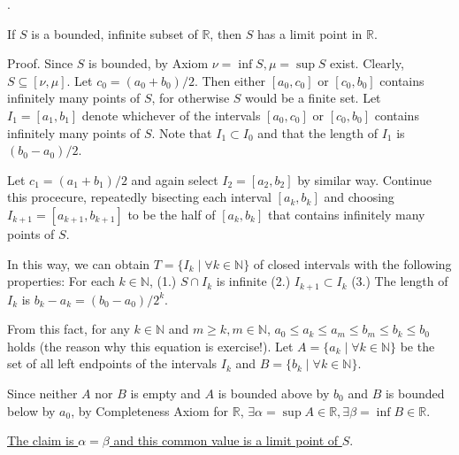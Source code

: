 \documentclass[8pt]{beamer}
\newcommand{\mbb}[1]{\mathbb{#1}}
\begin{document}
\begin{frame}{.}
    \begin{theorem}\label{th:4}
        If $S$ is a bounded, infinite subset of $\mbb{R}$, then $S$ has a limit point in $\mbb{R}$.

        \smallskip
        \text{}
        Proof.
        Since $S$ is bounded, by Axiom $\nu = \inf S, \mu = \sup S$ exist.
        Clearly, $S \subseteq [\nu, \mu]$.
        Let $c_0 = (a_0 + b_0)/2$.
        Then either $[a_0, c_0]$ or $[c_0, b_0]$ contains infinitely many points of $S$, for otherwise $S$ would be a finite set.
        Let $I_1 =[a_1, b_1]$ denote whichever of the intervals $[a_0, c_0]$ or $[c_0, b_0]$ contains infinitely many points of $S$.
        Note that $I_1 \subset I_0$ and that the length of $I_1$ is $(b_0 - a_0)/2$.

        Let $c_1 = (a_1 + b_1)/2$ and again select $I_2 = [a_2, b_2]$ by similar way.
        Continue this procecure, repeatedly bisecting each interval $[a_k, b_k]$ and choosing $I_{k+1} = [a_{k+1}, b_{k+1}]$ to be the half of $[a_k, b_k]$ that contains infinitely many points of $S$.

        In this way, we can obtain $T = \{I_k \mid \forall k \in \mbb{N}\}$ of closed intervals with the following properties:
        For each $k \in \mbb{N}$, (1.) $S \cap I_k$ is infinite (2.) $I_{k+1} \subset I_k$ (3.) The length of $I_k$ is $b_k - a_k = (b_0 - a_0)/ 2^k$.

        From this fact, for any $k \in \mbb{N}$ and $m \geq k, m \in \mbb{N}$, $a_0 \leq a_k \leq a_m \leq b_m \leq b_k \leq b_0$ holds (the reason why this equation is exercise!).
        Let $A = \{a_k \mid \forall k \in \mbb{N}\}$ be the set of all left endpoints of the intervals $I_k$ and $B = \{b_k \mid \forall k \in \mbb{N}\}$.

        Since neither $A$ nor $B$ is empty and $A$ is bounded above by $b_0$ and $B$ is bounded below by $a_0$, by Completeness Axiom for $\mbb{R}$, $\exists \alpha = \sup A \in \mbb{R}, \exists \beta = \inf B \in \mbb{R}$.

        \underline{The claim is $\alpha = \beta$ and this common value is a limit point of $S$}.
    \end{theorem}
\end{frame}
\end{document}
